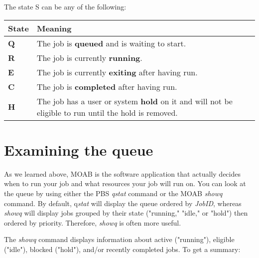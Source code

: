 The state S can be any of  the following:
\begin{tabular}{|p{0.4in}|p{3.6in}|} \hline
\textbf{State} & \textbf{Meaning} \\ \hline
\textbf{Q} & The job is \textbf{queued} and is waiting to start. \\ \hline
\textbf{R} & The job is currently \textbf{running}. \\ \hline
\textbf{E} & The job is currently \textbf{exiting} after having run. \\ \hline
\textbf{C} & The job is \textbf{completed} after having run. \\ \hline
\textbf{H} & The job has a user or system \textbf{hold} on it and will not be eligible to run until the hold is removed. \\ \hline
\end{tabular}

\section{Examining the queue}

As we learned above, MOAB is the software application that actually decides when to run your job and what resources your job will run on. You can look at the queue by using either the PBS \textit{qstat} command or the MOAB \textit{showq} command. By default, q\textit{stat} will display the queue ordered by \textit{JobID}, whereas \textit{showq} will display jobs grouped by their state ("running," "idle," or "hold") then ordered by priority.  Therefore, \textit{showq }is often more useful.

The \textit{showq} command displays information about active ("running"), eligible ("idle"), blocked ("hold"), and/or recently completed jobs. To get a summary:

